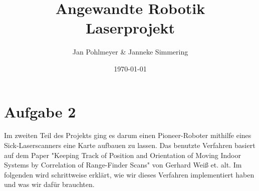 \documentclass[12pt, a4paper]{article}
\title{\textbf{Angewandte Robotik \\ Laserprojekt}}
\author{Jan Pohlmeyer \& Janneke Simmering}
\date{\today}
\begin{document}
\clearpage
\maketitle
\thispagestyle{empty}


\tableofcontents
\thispagestyle{empty}

\newpage

\setcounter{page}{1}



\section{Aufgabe 2}

Im zweiten Teil des Projekts ging es darum einen Pioneer-Roboter mithilfe eines Sick-Laserscanners eine Karte aufbauen zu lassen. Das benutzte Verfahren basiert auf dem Paper "Keeping Track of Position and Orientation of Moving Indoor Systems by Correlation of Range-Finder Scans" von Gerhard Weiß et. alt. Im folgenden wird schrittweise erklärt, wie wir dieses Verfahren implementiert haben und was wir dafür brauchten.




















\end{document}
